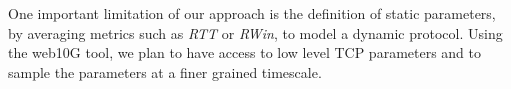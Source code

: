 \documentclass[]{algotel}
\begin{document}
One important limitation of our approach is the definition of static parameters, by averaging metrics such as \emph{RTT} or \emph{RWin}, to model a dynamic protocol. Using the web10G tool, we plan to have access to low level TCP parameters and to sample the parameters at a finer grained timescale.



\label{sec:biblio}
\end{document}
